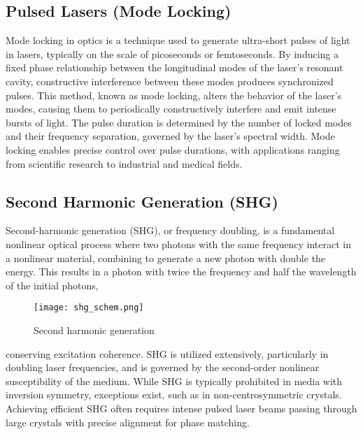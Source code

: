 \subsection{Pulsed Lasers (Mode Locking)}
    Mode locking in optics is a technique used to generate ultra-short pulses of light in lasers, typically on the scale of picoseconds or femtoseconds. 
    By inducing a fixed phase relationship between the longitudinal modes of the laser's resonant cavity, constructive interference between these modes produces synchronized pulses. 
    This method, known as mode locking, alters the behavior of the laser's modes, causing them to periodically constructively interfere and emit intense bursts of light. 
    The pulse duration is determined by the number of locked modes and their frequency separation, governed by the laser's spectral width. 
    Mode locking enables precise control over pulse durations, with applications ranging from scientific research to industrial and medical fields.

\subsection{Second Harmonic Generation (SHG)}
    Second-harmonic generation (SHG), or frequency doubling, is a fundamental nonlinear optical process where two photons with the same frequency interact in a nonlinear material, combining to generate a new photon with double the energy.
    This results in a photon with twice the frequency and half the wavelength of the initial photons,
    \begin{wrapfigure}[7]{r}[0cm]{0.4\textwidth}
        \centering
        \vspace{-\normalbaselineskip}
        \texttt{[image: shg\_schem.png]}
        \vspace{-10pt}
        \caption{Second harmonic generation }
        
        \label{fig:shg:basic}
    \end{wrapfigure}
    conserving excitation coherence. SHG is utilized extensively, particularly in doubling laser frequencies, and is governed by the second-order nonlinear susceptibility of the medium. 
    While SHG is typically prohibited in media with inversion symmetry, exceptions exist, such as in non-centrosymmetric crystals. 
    Achieving efficient SHG often requires intense pulsed laser beams passing through large crystals with precise alignment for phase matching.


